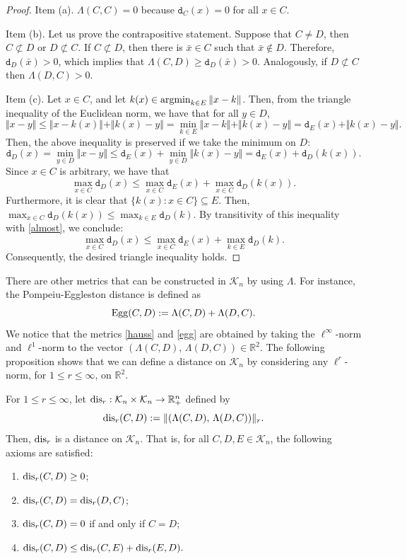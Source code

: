 \documentclass[hidelinks,onefignum,onetabnum]{siamart250211}
\theoremstyle{definition}
\theoremstyle{remark}
\newcommand{\R}{\mathbb R}
\newcommand{\bx}{\bar{x}}
\newcommand{\RR}{\mathbb R}
\newcommand{\dis}{{\rm dis}}
\newcommand{\argmin}{\mathop{\rm argmin}}
\newcommand{\dist}{\mathtt{d}}
\begin{document}
\begin{proof}
Item (a). $\Lambda(C,C)=0$ because $\dist_C(x)=0$ for all $x\in C$.

Item (b). Let us prove the contrapositive statement. Suppose that $C\neq D$, then $C\not\subset D$ or $D\not\subset C$. If $C\not\subset D$, then there is $\bx\in C$ such that $\bx\notin D$. Therefore, $\dist_D(\bx)>0$, which implies that $\Lambda(C,D)\geq\dist_D(\bx)>0$. Analogously, if $D\not\subset C$ then $\Lambda(D,C)>0$.

Item (c). Let $x\in C$, and let $k(x)\in\argmin_{k\in E}\Vert x-k\Vert$. Then, from the triangle inequality of the Euclidean norm, we have that for all $y\in D$,
\[\Vert x-y\Vert\leq \Vert x-k(x)\Vert+\Vert k(x)-y\Vert=\min_{k\in E}\Vert x-k\Vert + \Vert k(x)-y\Vert=\dist_E(x)+ \Vert k(x)-y\Vert.\]
Then, the above inequality is preserved if we take the minimum on $D$:
\[\dist_D(x)=\min_{y\in D}\Vert x-y\Vert\leq \dist_E(x) + \min_{y\in D}\Vert k(x)-y\Vert=\dist_E(x)+\dist_D(k(x)).\]
Since $x\in C$ is arbitrary, we have that
\begin{equation}\label{almost}
\max_{x\in C}\dist_D(x)\leq \max_{x\in C}\dist_E(x) + \max_{x\in C}\dist_D(k(x)).
\end{equation}
Furthermore, it is clear that $\{k(x):x\in C\}\subseteq E$. Then, $\max_{x\in C}\dist_D(k(x))\leq \max_{k\in E}\dist_D(k)$.
By transitivity of this inequality with \eqref{almost},  we conclude:
\[\max_{x\in C}\dist_D(x)\leq \max_{x\in C}\dist_E(x) + \max_{k\in E}\dist_D(k).\]
Consequently, the desired triangle inequality holds.
\end{proof}
There are other metrics that can be constructed in $\mathcal K_n$ by using $\Lambda$. For instance, the Pompeiu-Eggleston distance \cite[Chapter\,9]{Deza} is defined as
\begin{equation}\label{egg}
{\rm Egg}(C,D):=\Lambda(C,D)+\Lambda(D,C).
\end{equation}
We notice that the metrics \eqref{hauss} and \eqref{egg} are obtained by taking the $\ell^\infty$-norm and $\ell^1$-norm to the vector $(\Lambda(C,D),\,\Lambda(D,C))\in\RR^2$. The following proposition shows that we can define a distance on $\mathcal K_n$ by considering any $\ell^r$-norm, for $1\leq r\leq \infty$, on $\R^2$.
\begin{proposition}\label{prop:disr}
For $1\leq r\leq \infty$, let ${\rm dis}_r:\mathcal K_n\times\mathcal K_n\to\RR^n_+$ defined by
\begin{equation}\label{dissset}
{\rm dis}_r(C,D):=\Vert(\Lambda(C,D),\,\Lambda(D,C))\Vert_r.
\end{equation}
Then, ${\rm dis}_r$ is a distance on $\mathcal K_n$. That is, for all $C,D,E\in\mathcal K_n$, the following axioms are satisfied:
\begin{enumerate}
\item[(a)] $\dis_r(C,D)\geq 0$;
\item[(b)] $\dis_r(C,D)=\dis_r(D,C)$;
\item[(c)] $\dis_r(C,D)=0$ if and only if $C=D$;
\item[(d)] $\dis_r(C,D)\leq \dis_r(C,E)+\dis_r(E,D).$
\end{enumerate}
\end{proposition}
\end{document}
